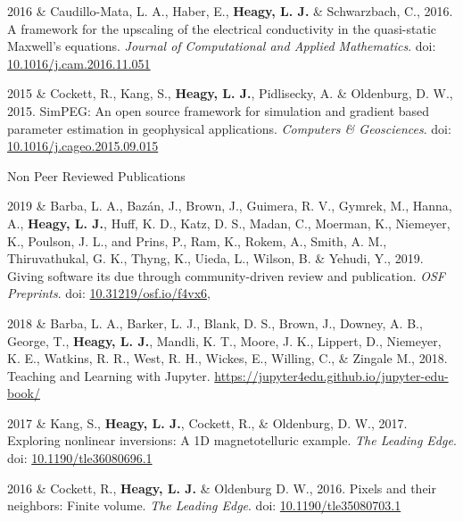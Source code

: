 \documentclass[a4paper, 11pt]{article}
\newcommand{\doi}[1]{doi: \href{https://doi.org/#1}{#1}}
\newcommand{\subheading}[1]{
    \vspace{0.4cm}
    {\Large #1}\\
    \vspace{-0.2cm}
}
\begin{document}
\begin{entryright}
2016 & Caudillo-Mata, L. A., Haber, E., \textbf{Heagy, L. J.} \& Schwarzbach, C., 2016. A framework for the upscaling of the electrical conductivity in the quasi-static Maxwell's equations. \emph{Journal of Computational and Applied Mathematics}. \doi{10.1016/j.cam.2016.11.051}
\end{entryright}

\begin{entryright}
2015 & Cockett, R., Kang, S., \textbf{Heagy, L. J.}, Pidlisecky, A. \& Oldenburg, D. W., 2015. SimPEG: An open source framework for simulation and gradient based parameter estimation in geophysical applications. \emph{Computers \& Geosciences}. \doi{10.1016/j.cageo.2015.09.015}
\end{entryright}


\subheading{Non Peer Reviewed Publications}

\begin{entryright}
2019 & Barba, L. A., Baz\'an, J., Brown, J., Guimera, R. V., Gymrek, M., Hanna, A., \textbf{Heagy, L. J.}, Huff, K. D., Katz, D. S., Madan, C., Moerman, K., Niemeyer, K., Poulson, J. L., and Prins, P., Ram, K., Rokem, A., Smith, A. M., Thiruvathukal, G. K., Thyng, K., Uieda, L., Wilson, B. \& Yehudi, Y.,
2019. Giving software its due through community-driven review and publication. \emph{OSF Preprints}. \doi{10.31219/osf.io/f4vx6},
\end{entryright}

\begin{entryright}
2018 & Barba, L. A., Barker, L. J., Blank, D. S., Brown, J., Downey, A. B., George, T., \textbf{Heagy, L. J.},  Mandli, K. T., Moore, J. K., Lippert, D.,  Niemeyer, K. E., Watkins, R. R., West, R. H., Wickes, E., Willing, C., \& Zingale M., 2018. Teaching and Learning with Jupyter. \href{https://jupyter4edu.github.io/jupyter-edu-book/}{https://jupyter4edu.github.io/jupyter-edu-book/}
\end{entryright}

\begin{entryright}
2017 & Kang, S., \textbf{Heagy, L. J.}, Cockett, R., \& Oldenburg, D. W., 2017. Exploring nonlinear inversions: A 1D magnetotelluric example. \emph{The Leading Edge}. \doi{10.1190/tle36080696.1}
\end{entryright}

\begin{entryright}
2016 & Cockett, R., \textbf{Heagy, L. J.} \& Oldenburg D. W., 2016. Pixels and their neighbors: Finite volume. \emph{The Leading Edge}. \doi{10.1190/tle35080703.1}
\end{entryright}
\end{document}
